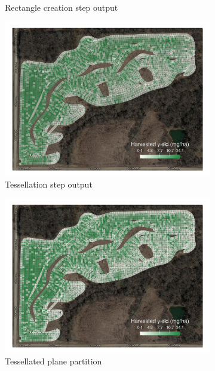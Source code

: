 \documentclass[12pt]{article}
\begin{document}
\begin{figure}
\begin{subfigure}[b]{0.49\textwidth}
    \caption{Rectangle creation step output}
  \end{subfigure}
  \begin{subfigure}[b]{0.49\textwidth}
    \centering
    \includegraphics[width=1\textwidth]{appendix/basswood_2012_res5_1_reshaped}
    \caption{Tessellation step output}
  \end{subfigure}
  \begin{subfigure}[b]{0.49\textwidth}
    \centering
    \includegraphics[width=1\textwidth]{appendix/basswood_2012_res5_1_chopped}
    \caption{Tessellated plane partition}
   \end{subfigure}
  \begin{subfigure}[b]{0.49\textwidth}
    \centering

\end{subfigure}
\end{figure}
\end{document}
